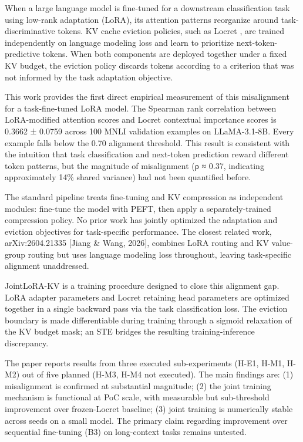 
When a large language model is fine-tuned for a downstream classification task using low-rank adaptation (LoRA), its attention patterns reorganize around task-discriminative tokens. KV cache eviction policies, such as Locret \citep{Huangetal2024}, are trained independently on language modeling loss and learn to prioritize next-token-predictive tokens. When both components are deployed together under a fixed KV budget, the eviction policy discards tokens according to a criterion that was not informed by the task adaptation objective.

This work provides the first direct empirical measurement of this misalignment for a task-fine-tuned LoRA model. The Spearman rank correlation between LoRA-modified attention scores and Locret contextual importance scores is 0.3662 ± 0.0759 across 100 MNLI validation examples on LLaMA-3.1-8B. Every example falls below the 0.70 alignment threshold. This result is consistent with the intuition that task classification and next-token prediction reward different token patterns, but the magnitude of misalignment (ρ ≈ 0.37, indicating approximately 14\% shared variance) had not been quantified before.

The standard pipeline treats fine-tuning and KV compression as independent modules: fine-tune the model with PEFT, then apply a separately-trained compression policy. No prior work has jointly optimized the adaptation and eviction objectives for task-specific performance. The closest related work, arXiv:2604.21335 [Jiang \& Wang, 2026], combines LoRA routing and KV value-group routing but uses language modeling loss throughout, leaving task-specific alignment unaddressed.

JointLoRA-KV is a training procedure designed to close this alignment gap. LoRA adapter parameters and Locret retaining head parameters are optimized together in a single backward pass via the task classification loss. The eviction boundary is made differentiable during training through a sigmoid relaxation of the KV budget mask; an STE bridges the resulting training-inference discrepancy.

The paper reports results from three executed sub-experiments (H-E1, H-M1, H-M2) out of five planned (H-M3, H-M4 not executed). The main findings are: (1) misalignment is confirmed at substantial magnitude; (2) the joint training mechanism is functional at PoC scale, with measurable but sub-threshold improvement over frozen-Locret baseline; (3) joint training is numerically stable across seeds on a small model. The primary claim regarding improvement over sequential fine-tuning (B3) on long-context tasks remains untested.

